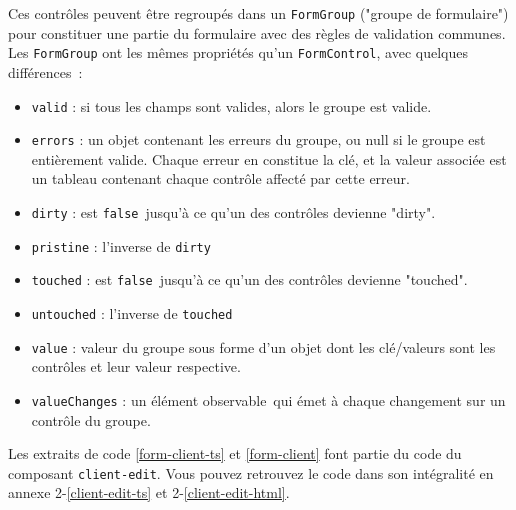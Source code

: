 \vspace{1.2ex}
Ces contrôles peuvent être regroupés dans un \texttt{FormGroup} ("groupe de formulaire") pour constituer une partie du formulaire avec des règles de validation communes. Les \texttt{FormGroup} ont les mêmes propriétés qu’un \texttt{FormControl}, avec quelques différences :
\begin{itemize}
	\item \texttt{valid} : si tous les champs sont valides, alors le groupe est valide.
	\item \texttt{errors} : un objet contenant les erreurs du groupe, ou null si le groupe est entièrement valide. Chaque erreur en constitue la clé, et la valeur associée est un tableau contenant chaque contrôle affecté par cette erreur.
	\item \texttt{dirty} : est \texttt{false} jusqu’à ce qu’un des contrôles devienne "dirty".
	\item \texttt{pristine} : l'inverse de \texttt{dirty}
	\item \texttt{touched} : est \texttt{false} jusqu’à ce qu’un des contrôles devienne "touched".
	\item \texttt{untouched} : l'inverse de \texttt{touched}
	\item \texttt{value} : valeur du groupe sous forme d'un objet dont les clé/valeurs sont les contrôles et leur valeur respective.
	\item \texttt{valueChanges} : un élément observable qui émet à chaque changement sur un contrôle du groupe.
\end{itemize}

\vspace{1.2ex}
Les extraits de code \ref{form-client-ts} et \ref{form-client} font partie du code du composant \texttt{client-edit}. Vous pouvez retrouvez le code dans son intégralité en annexe 2-\ref{client-edit-ts} et 2-\ref{client-edit-html}.

